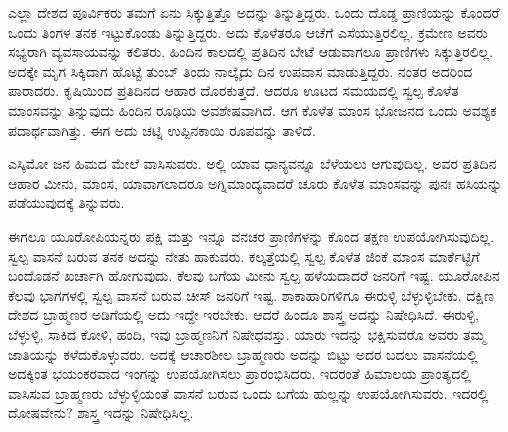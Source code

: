 ಎಲ್ಲಾ ದೇಶದ ಪೂರ್ವಿಕರು ತಮಗೆ ಏನು ಸಿಕ್ಕುತ್ತಿತ್ತೊ ಅದನ್ನು ತಿನ್ನುತ್ತಿದ್ದರು. ಒಂದು ದೊಡ್ಡ ಪ್ರಾಣಿಯನ್ನು ಕೊಂದರೆ ಒಂದು ತಿಂಗಳ ತನಕ ಇಟ್ಟುಕೊಂಡು ತಿನ್ನುತ್ತಿದ್ದರು. ಅದು ಕೊಳೆತರೂ ಆಚೆಗೆ ಎಸೆಯುತ್ತಿರಲಿಲ್ಲ. ಕ್ರಮೇಣ ಅವರು ಸಭ್ಯರಾಗಿ ವ್ಯವಸಾಯವನ್ನು ಕಲಿತರು. ಹಿಂದಿನ ಕಾಲದಲ್ಲಿ ಪ್ರತಿದಿನ ಬೇಟೆ ಆಡುವಾಗಲೂ ಪ್ರಾಣಿಗಳು ಸಿಕ್ಕುತ್ತಿರಲಿಲ್ಲ. ಅದಕ್ಕೇ ಮೃಗ ಸಿಕ್ಕಿದಾಗ ಹೊಟ್ಟೆ ತುಂಬ್ ತಿಂದು ನಾಲ್ಕೈದು ದಿನ ಉಪವಾಸ ಮಾಡುತ್ತಿದ್ದರು. ನಂತರ ಅದರಿಂದ ಪಾರಾದರು. ಕೃಷಿಯಿಂದ ಪ್ರತಿದಿನದ ಆಹಾರ ದೊರಕುತ್ತದೆ. ಆದರೂ ಊಟದ ಸಮಯದಲ್ಲಿ ಸ್ವಲ್ಪ ಕೊಳೆತ ಮಾಂಸವನ್ನು ತಿನ್ನುವುದು ಹಿಂದಿನ ರೂಢಿಯ ಅವಶೇಷವಾಗಿದೆ. ಆಗ ಕೊಳೆತ ಮಾಂಸ ಭೋಜನದ ಒಂದು ಅವಶ್ಯಕ ಪದಾರ್ಥವಾಗಿತ್ತು. ಈಗ ಅದು ಚಟ್ನಿ ಉಪ್ಪಿನಕಾಯಿ ರೂಪವನ್ನು ತಾಳಿದೆ.

ಎಸ್ಕಿಮೋ ಜನ ಹಿಮದ ಮೇಲೆ ವಾಸಿಸುವರು. ಅಲ್ಲಿ ಯಾವ ಧಾನ್ಯವನ್ನೂ ಬೆಳೆಯಲು ಆಗುವುದಿಲ್ಲ. ಅವರ ಪ್ರತಿದಿನ ಆಹಾರ ಮೀನು, ಮಾಂಸ, ಯಾವಾಗಲಾದರೂ ಅಗ್ನಿಮಾಂದ್ಯವಾದರೆ ಚೂರು ಕೊಳೆತ ಮಾಂಸವನ್ನು ಪುನಃ ಹಸಿಯನ್ನು ಪಡೆಯುವುದಕ್ಕೆ ತಿನ್ನುವರು.

ಈಗಲೂ ಯೂರೋಪಿಯನ್ನರು ಪಕ್ಷಿ ಮತ್ತು ಇನ್ನೂ ವನಚರ ಪ್ರಾಣಿಗಳನ್ನು ಕೊಂದ ತಕ್ಷಣ ಉಪಯೋಗಿಸುವುದಿಲ್ಲ. ಸ್ವಲ್ಪ ವಾಸನೆ ಬರುವ ತನಕ ಅದನ್ನು ನೇತು ಹಾಕುವರು. ಕಲ್ಕತ್ತೆಯಲ್ಲಿ ಸ್ವಲ್ಪ ಕೊಳೆತ ಜಿಂಕೆ ಮಾಂಸ ಮಾರ್ಕೆಟ್ಟಿಗೆ ಬಂದೊಡನೆ ಖರ್ಚಾಗಿ ಹೋಗುವುದು. ಕೆಲವು ಬಗೆಯ ಮೀನು ಸ್ವಲ್ಪ ಹಳೆಯದಾದರೆ ಜನರಿಗೆ ಇಷ್ಟ. ಯೂರೋಪಿನ ಕೆಲವು ಭಾಗಗಳಲ್ಲಿ ಸ್ವಲ್ಪ ವಾಸನೆ ಬರುವ ಚೀಸ್​ ಜನರಿಗೆ ಇಷ್ಟ. ಶಾಕಾಹಾರಿಗಳಿಗೂ ಈರುಳ್ಳಿ ಬೆಳ್ಳುಳ್ಳಿಬೇಕು. ದಕ್ಷಿಣ ದೇಶದ ಬ್ರಾಹ್ಮಣರ ಅಡಿಗೆಯಲ್ಲಿ ಅದು ಇದ್ದೇ ಇರಬೇಕು. ಆದರೆ ಹಿಂದೂ ಶಾಸ್ತ್ರ ಅದನ್ನು ನಿಷೇಧಿಸಿದೆ. ಈರುಳ್ಳಿ, ಬೆಳ್ಳುಳ್ಳಿ, ಸಾಕಿದ ಕೋಳಿ, ಹಂದಿ, ಇವು ಬ್ರಾಹ್ಮಣನಿಗೆ ನಿಷೇಧವಸ್ತು. ಯಾರು ಇದನ್ನು ಭಕ್ಷಿಸುವರೊ ಅವರು ತಮ್ಮ ಜಾತಿಯನ್ನು ಕಳೆದುಕೊಳ್ಳುವರು. ಅದಕ್ಕೆ ಆಚಾರಶೀಲ ಬ್ರಾಹ್ಮಣರು ಅದನ್ನು ಬಿಟ್ಟು ಅದರ ಬದಲು ವಾಸನೆಯಲ್ಲಿ ಅದಕ್ಕಿಂತ ಭಯಂಕರವಾದ ಇಂಗನ್ನು ಉಪಯೋಗಿಸಲು ಪ್ರಾರಂಭಿಸಿದರು. ಇದರಂತೆ ಹಿಮಾಲಯ ಪ್ರಾಂತ್ಯದಲ್ಲಿ ವಾಸಿಸುವ ಬ್ರಾಹ್ಮಣರು ಬೆಳ್ಳುಳ್ಳಿಯಂತೆ ವಾಸನೆ ಬರುವ ಒಂದು ಬಗೆಯ ಹುಲ್ಲನ್ನು ಉಪಯೋಗಿಸುವರು. ಇದರಲ್ಲಿ ದೋಷವೇನು? ಶಾಸ್ತ್ರ ಇದನ್ನು ನಿಷೇಧಿಸಿಲ್ಲ.

